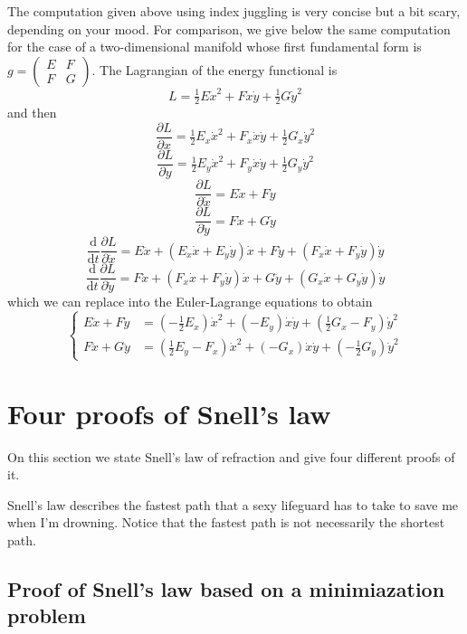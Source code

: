 The computation given above using index juggling is very concise but a bit
scary, depending on your mood.  For comparison, we give below the same
computation for the case of a two-dimensional manifold whose first
fundamental form
is~$g=\left(\begin{smallmatrix}E & F \\ F & G\end{smallmatrix}\right)$.  The
Lagrangian of the energy functional is
$$
L=
\tfrac{1}{2}E\dot x^2+F\dot x\dot y+\tfrac{1}{2}G\dot y^2
$$
and then
$$
\frac{\partial L}{\partial x}
=
\tfrac{1}{2}E_x\dot x^2+F_x\dot x\dot y+\tfrac{1}{2}G_x\dot y^2
$$
$$
\frac{\partial L}{\partial y}
=
\tfrac{1}{2}E_y\dot x^2+F_y\dot x\dot y+\tfrac{1}{2}G_y\dot y^2
$$
$$
\frac{\partial L}{\partial \dot x}
=
E\dot x+F\dot y
$$
$$
\frac{\partial L}{\partial \dot y}
=
F\dot x+G\dot y
$$
$$
\frac{\mathrm{d}}{\mathrm{d} t}
\frac{\partial L}{\partial \dot x}
=
E\ddot x
+\left(E_x\dot x+E_y\dot y\right)\dot x
+F\ddot y
+\left(F_x\dot x+F_y\dot y\right)\dot y
$$
$$
\frac{\mathrm{d}}{\mathrm{d} t}
\frac{\partial L}{\partial \dot y}
=
F\ddot x
+\left(F_x\dot x+F_y\dot y\right)\dot x
+G\ddot y
+\left(G_x\dot x+G_y\dot y\right)\dot y
$$
which we can replace into the Euler-Lagrange equations to obtain
$$
\begin{cases}
	E\ddot x+F\ddot y &=
	\left(-\tfrac{1}{2}E_x\right)\dot x^2
	+\left(-E_y\right)\dot x\dot y
	+\left(\tfrac{1}{2}G_x-F_y\right)\dot y^2
	\\
	F\ddot x+G\ddot y &=
	\left(\tfrac{1}{2}E_y-F_x\right)\dot x^2
	+\left(-G_x\right)\dot x\dot y
	+
	\left(-\tfrac{1}{2}G_y\right)\dot y^2
\end{cases}
$$




\section{Four proofs of Snell's law}

On this section we state Snell's law of refraction and give four different
proofs of it.

Snell's law describes the fastest path that a sexy lifeguard has to take to
save me when I'm drowning.  Notice that the fastest path is not necessarily the shortest path.

\subsection{Proof of Snell's law based on a minimiazation problem}

